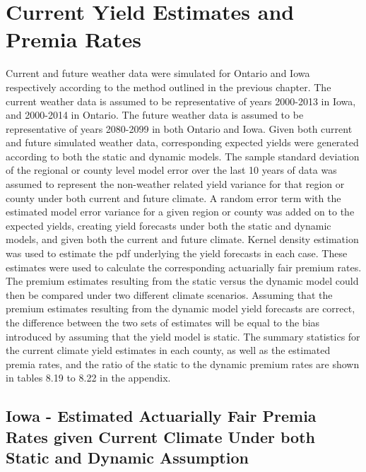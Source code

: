\section{Current Yield Estimates and Premia Rates}

Current and future weather data were simulated for Ontario and Iowa respectively according to the method outlined in the previous chapter. The current weather data is assumed to be representative of years 2000-2013 in Iowa, and 2000-2014 in Ontario. The future weather data is assumed to be representative of years 2080-2099 in both Ontario and Iowa. Given both current and future simulated weather data, corresponding expected yields were generated according to both the static and dynamic models. The sample standard deviation of the regional or county level model error over the last 10 years of data was assumed to represent the non-weather related yield variance for that region or county under both current and future climate. A random error term with the estimated model error variance for a given region or county was added on to the expected yields, creating yield forecasts under both the static and dynamic models, and given both the current and future climate. Kernel density estimation was used to estimate the pdf underlying the yield forecasts in each case. These estimates were used to calculate the corresponding actuarially fair premium rates. The premium estimates resulting from the static versus the dynamic model could then be compared under two different climate scenarios. Assuming that the premium estimates resulting from the dynamic model yield forecasts are correct, the difference between the two sets of estimates will be equal to the bias introduced by assuming that the yield model is static. The summary statistics for the current climate yield estimates in each county, as well as the estimated premia rates, and the ratio of the static to the dynamic premium rates are shown in tables 8.19 to 8.22 in the appendix. 


\subsection{Iowa -  Estimated Actuarially Fair Premia Rates given Current Climate Under both Static and Dynamic Assumption}

